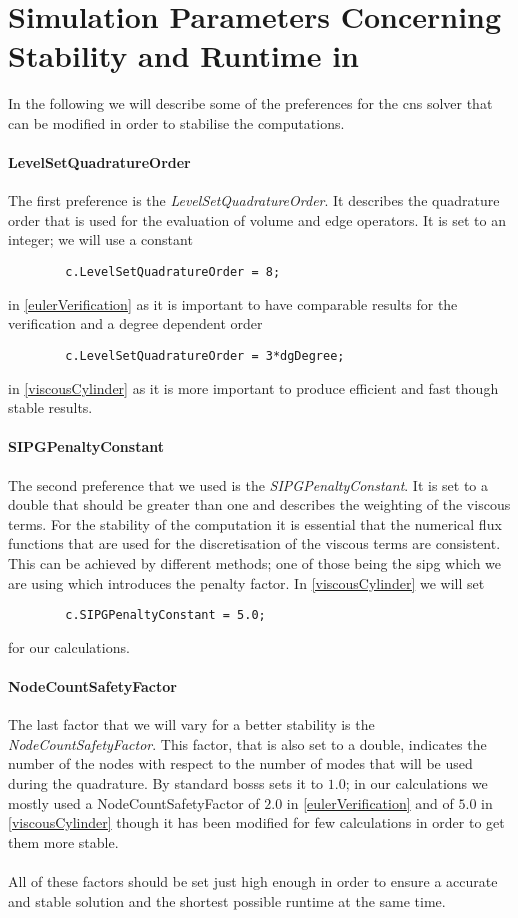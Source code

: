 	\section{Simulation Parameters Concerning Stability and Runtime in }
	\label{parameters}
	
	In the following we will describe some of the preferences for the \gls{cns} solver that can be modified in order to stabilise the computations. 
	
	\paragraph{LevelSetQuadratureOrder}
	The first preference is the \textit{LevelSetQuadratureOrder}. It describes the quadrature order that is used for the evaluation of volume and edge operators. It is set to an integer; we will use a constant
	\begin{lstlisting}
		c.LevelSetQuadratureOrder = 8;
	\end{lstlisting}
	in \cref{eulerVerification} as it is important to have comparable results for the verification and a degree dependent order
	\begin{lstlisting}
		c.LevelSetQuadratureOrder = 3*dgDegree;
	\end{lstlisting}
	in \cref{viscousCylinder} as it is more important to produce efficient and fast though stable results. 
	
	\paragraph{SIPGPenaltyConstant}
	 The second preference that we used is the \textit{SIPGPenaltyConstant}. It is set to a double that should be greater than one and describes the weighting of the viscous terms. For the stability of the computation it is essential that the numerical flux functions that are used for the discretisation of the viscous terms are consistent. This can be achieved by different methods; one of those being the \gls{sipg} which we are using which introduces the penalty factor. In \cref{viscousCylinder} we will set 
	 \begin{lstlisting}
		c.SIPGPenaltyConstant = 5.0;
	 \end{lstlisting}
	for our calculations.
		 
	\paragraph{NodeCountSafetyFactor}
	The last factor that we will vary for a better stability is the \textit{NodeCountSafetyFactor}. This factor, that is also set to a double, indicates the number of the nodes with respect to the number of modes that will be used during the quadrature. By standard \gls{bosss} sets it to $1.0$; in our calculations we mostly used a NodeCountSafetyFactor of $2.0$  in \cref{eulerVerification} and of $5.0$ in \cref{viscousCylinder} though it has been modified for few calculations in order to get them more stable.\\\\
	
     All of these factors should be set just high enough in order to ensure a accurate and stable solution and the shortest possible runtime at the same time. 
     

	